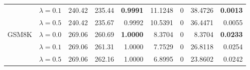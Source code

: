 \begin{table}[t]
{\begin{tabular}{l l rrrrrrr}
 & $\lambda{=}0.1$ & 240.42 & 235.44 & \textbf{0.9991} & 11.1248 & \cellcolor{cyan!12} $0$ & 38.4726 & \textbf{0.0013} \\
 & $\lambda{=}0.5$ & 240.42 & 235.67 & 0.9992 & 10.5391 & \cellcolor{cyan!12} $0$ & 36.4471 & 0.0055 \\
\midrule
GSM8K & $\lambda{=}0.0$ & 269.06 & 260.69 & \textbf{1.0000} & 8.3704 & \cellcolor{cyan!12} $0$ & 8.3704 & \textbf{0.0233} \\
 & $\lambda{=}0.1$ & 269.06 & 261.31 & 1.0000 & 7.7529 & \cellcolor{cyan!12} $0$ & 26.8118 & 0.0254 \\
 & $\lambda{=}0.5$ & 269.06 & 262.16 & 1.0000 & 6.8995 & \cellcolor{cyan!12} $0$ & 23.8602 & 0.0242 \\
\bottomrule
\end{tabular}}
\end{table}